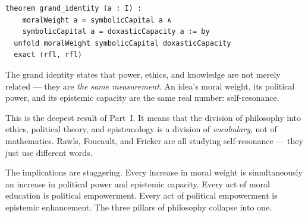 \begin{lstlisting}
theorem grand_identity (a : I) :
    moralWeight a = symbolicCapital a ∧
    symbolicCapital a = doxasticCapacity a := by
  unfold moralWeight symbolicCapital doxasticCapacity
  exact ⟨rfl, rfl⟩
\end{lstlisting}

\begin{interpretation}
The grand identity states that power, ethics, and knowledge are not merely related --- they are \emph{the same measurement}.  An idea's moral weight, its political power, and its epistemic capacity are the same real number: self-resonance.

This is the deepest result of Part~I.  It means that the division of philosophy into ethics, political theory, and epistemology is a division of \emph{vocabulary}, not of mathematics.  Rawls, Foucault, and Fricker are all studying self-resonance --- they just use different words.

The implications are staggering.  Every increase in moral weight is simultaneously an increase in political power and epistemic capacity.  Every act of moral education is political empowerment.  Every act of political empowerment is epistemic enhancement.  The three pillars of philosophy collapse into one.
\end{interpretation}
